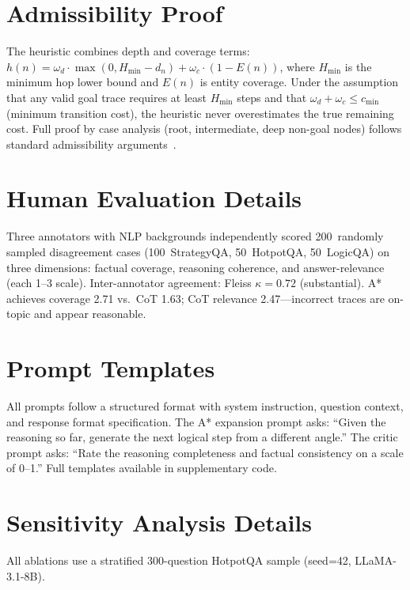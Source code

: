 \documentclass[11pt]{article}
\begin{document}
\section{Admissibility Proof}
\label{app:proof}

The heuristic combines depth and coverage terms:
$h(n) = \omega_d \cdot \max(0, H_{\min} - d_n) + \omega_c \cdot (1 - E(n))$,
where $H_{\min}$ is the minimum hop lower bound and $E(n)$ is entity coverage.
Under the assumption that any valid goal trace requires at least $H_{\min}$
steps and that $\omega_d + \omega_c \leq c_{\min}$ (minimum transition cost),
the heuristic never overestimates the true remaining cost.  Full proof by
case analysis (root, intermediate, deep non-goal nodes) follows standard
admissibility arguments~\citep{hart1968formal}.

\section{Human Evaluation Details}
\label{app:human_eval}

Three annotators with NLP backgrounds independently scored 200~randomly sampled
disagreement cases (100~StrategyQA, 50~HotpotQA, 50~LogicQA) on three
dimensions: factual coverage, reasoning coherence, and answer-relevance (each
1--3 scale).  Inter-annotator agreement: Fleiss $\kappa = 0.72$ (substantial).
A* achieves coverage 2.71 vs.\ CoT 1.63; CoT relevance 2.47---incorrect traces
are on-topic and appear reasonable.

\section{Prompt Templates}
\label{app:prompts}

All prompts follow a structured format with system instruction, question
context, and response format specification.  The A* expansion prompt asks:
``Given the reasoning so far, generate the next logical step from a different
angle.''  The critic prompt asks: ``Rate the reasoning completeness and
factual consistency on a scale of 0--1.''  Full templates available in
supplementary code.

\section{Sensitivity Analysis Details}
\label{app:sensitivity}

All ablations use a stratified 300-question HotpotQA sample (seed=42, LLaMA-3.1-8B).
\end{document}
